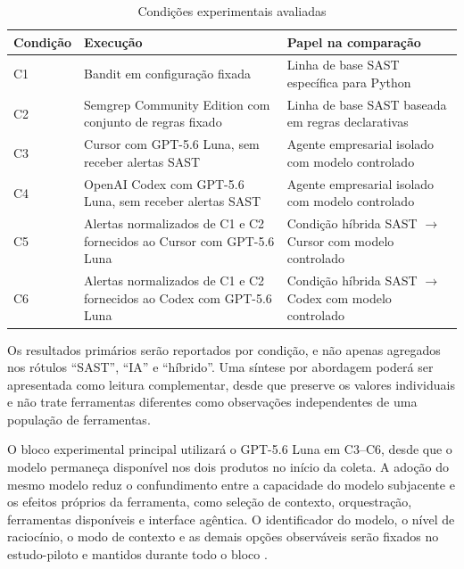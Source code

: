 \begin{table}[htb]
\ABNTEXfontereduzida
\caption{\label{tab:condicoes-experimentais}Condições experimentais avaliadas}
\centering
\begin{tabularx}{\textwidth}{|l|X|X|}
\hline
\textbf{Condição} & \textbf{Execução} & \textbf{Papel na comparação} \\
\hline
C1 & Bandit em configuração fixada & Linha de base SAST específica para Python \\
\hline
C2 & Semgrep Community Edition com conjunto de regras fixado & Linha de base SAST baseada em regras declarativas \\
\hline
C3 & Cursor com GPT-5.6 Luna, sem receber alertas SAST & Agente empresarial isolado com modelo controlado \\
\hline
C4 & OpenAI Codex com GPT-5.6 Luna, sem receber alertas SAST & Agente empresarial isolado com modelo controlado \\
\hline
C5 & Alertas normalizados de C1 e C2 fornecidos ao Cursor com GPT-5.6 Luna & Condição híbrida SAST $\rightarrow$ Cursor com modelo controlado \\
\hline
C6 & Alertas normalizados de C1 e C2 fornecidos ao Codex com GPT-5.6 Luna & Condição híbrida SAST $\rightarrow$ Codex com modelo controlado \\
\hline
\end{tabularx}
\end{table}

Os resultados primários serão reportados por condição, e não apenas agregados nos rótulos ``SAST'', ``IA'' e ``híbrido''. Uma síntese por abordagem poderá ser apresentada como leitura complementar, desde que preserve os valores individuais e não trate ferramentas diferentes como observações independentes de uma população de ferramentas.

O bloco experimental principal utilizará o GPT-5.6 Luna em C3--C6, desde que o modelo permaneça disponível nos dois produtos no início da coleta. A adoção do mesmo modelo reduz o confundimento entre a capacidade do modelo subjacente e os efeitos próprios da ferramenta, como seleção de contexto, orquestração, ferramentas disponíveis e interface agêntica. O identificador do modelo, o nível de raciocínio, o modo de contexto e as demais opções observáveis serão fixados no estudo-piloto e mantidos durante todo o bloco \cite{Cursor2026Models, OpenAI2026ModelGuidance}.

